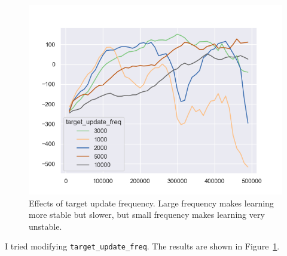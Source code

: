 \begin{figure}[htbp]
    \centering
    \includegraphics[width=0.5\linewidth]{figures/q3}
    \caption{Effects of target update frequency. Large frequency makes learning more stable but slower, but small frequency makes learning very unstable.}
    \label{fig:q3}
\end{figure}

I tried modifying \verb|target_update_freq|. The results are shown in Figure~\ref{fig:q3}.